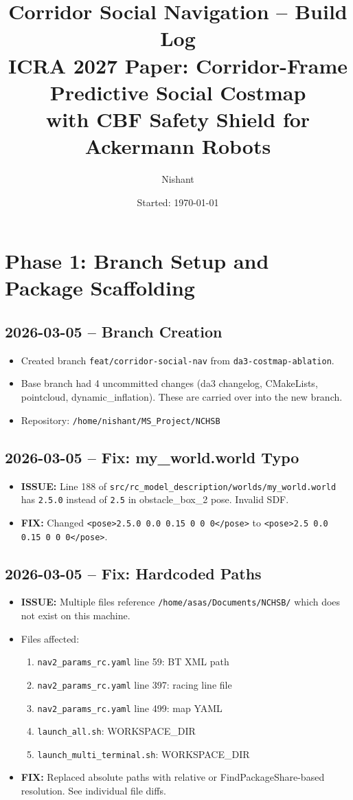 \documentclass[11pt]{article}
\title{Corridor Social Navigation -- Build Log\\
\large ICRA 2027 Paper: Corridor-Frame Predictive Social Costmap\\with CBF Safety Shield for Ackermann Robots}
\author{Nishant}
\date{Started: \today}
\newcommand{\logentry}[1]{\subsection*{#1}}
\newcommand{\issue}[1]{\textcolor{issuered}{\textbf{ISSUE:} #1}}
\newcommand{\fix}[1]{\textcolor{fixgreen}{\textbf{FIX:} #1}}
\begin{document}
\maketitle
\tableofcontents
\newpage

\section{Phase 1: Branch Setup and Package Scaffolding}

\logentry{2026-03-05 -- Branch Creation}
\begin{itemize}
  \item Created branch \texttt{feat/corridor-social-nav} from \texttt{da3-costmap-ablation}.
  \item Base branch had 4 uncommitted changes (da3 changelog, CMakeLists, pointcloud, dynamic\_inflation). These are carried over into the new branch.
  \item Repository: \texttt{/home/nishant/MS\_Project/NCHSB}
\end{itemize}

\logentry{2026-03-05 -- Fix: my\_world.world Typo}
\begin{itemize}
  \item \issue{Line 188 of \texttt{src/rc\_model\_description/worlds/my\_world.world} has \texttt{2.5.0} instead of \texttt{2.5} in obstacle\_box\_2 pose. Invalid SDF.}
  \item \fix{Changed \texttt{<pose>2.5.0 0.0 0.15 0 0 0</pose>} to \texttt{<pose>2.5 0.0 0.15 0 0 0</pose>}.}
\end{itemize}

\logentry{2026-03-05 -- Fix: Hardcoded Paths}
\begin{itemize}
  \item \issue{Multiple files reference \texttt{/home/asas/Documents/NCHSB/} which does not exist on this machine.}
  \item Files affected:
  \begin{enumerate}
    \item \texttt{nav2\_params\_rc.yaml} line 59: BT XML path
    \item \texttt{nav2\_params\_rc.yaml} line 397: racing line file
    \item \texttt{nav2\_params\_rc.yaml} line 499: map YAML
    \item \texttt{launch\_all.sh}: WORKSPACE\_DIR
    \item \texttt{launch\_multi\_terminal.sh}: WORKSPACE\_DIR
  \end{enumerate}
  \item \fix{Replaced absolute paths with relative or FindPackageShare-based resolution. See individual file diffs.}
\end{itemize}
\end{document}
